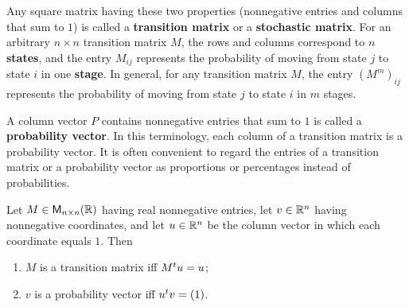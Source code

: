 \begin{defn}\label{5.3.4}
	Any square matrix having these two properties (nonnegative entries and columns that sum to \(1\)) is called a \textbf{transition matrix} or a \textbf{stochastic matrix}.
	For an arbitrary \(n \times n\) transition matrix \(M\), the rows and columns correspond to \(n\) \textbf{states}, and the entry \(M_{i j}\) represents the probability of moving from state \(j\) to state \(i\) in one \textbf{stage}.
	In general, for any transition matrix \(M\), the entry \((M^m)_{i j}\) represents the probability of moving from state \(j\) to state \(i\) in \(m\) stages.

	A column vector \(P\) contains nonnegative entries that sum to \(1\) is called a \textbf{probability vector}.
	In this terminology, each column of a transition matrix is a probability vector.
	It is often convenient to regard the entries of a transition matrix or a probability vector as proportions or percentages instead of probabilities.
\end{defn}

\begin{thm}\label{5.15}
	Let \(M \in \mathsf{M}_{{n} \times n}({\mathbb{R}})\) having real nonnegative entries, let \(v \in \mathbb{R}^n\) having nonnegative coordinates, and let \(u \in \mathbb{R}^n\) be the column vector in which each coordinate equals \(1\).
	Then
	\begin{enumerate}
		\item \(M\) is a transition matrix iff \({M}^{t} u = u\);
		\item \(v\) is a probability vector iff \({u}^{t} v = (1)\).
	\end{enumerate}
\end{thm}

